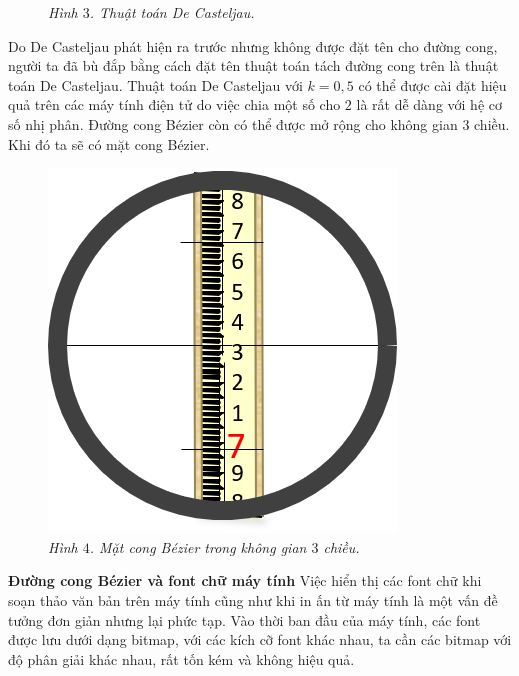 \begin{multicols}{2}
\begin{figure}[H]
		\caption{\small\textit{\color{toanhocdoisong}Hình $3$. Thuật toán De Casteljau.}}
		\vspace*{-5pt}
	\end{figure}
	Do De Casteljau phát hiện ra trước nhưng không được đặt tên cho đường cong, người ta đã bù đắp bằng cách đặt tên thuật toán tách đường cong trên là thuật toán De Casteljau. Thuật toán De Casteljau với $k=0,5$ có thể được cài đặt hiệu quả trên các máy tính điện tử do việc chia một số cho $2$ là rất dễ dàng với hệ cơ số nhị phân.
	\vskip 0.1cm
	Đường cong Bézier còn có thể được mở rộng cho không gian $3$ chiều. Khi đó ta sẽ có mặt cong Bézier.
	\begin{figure}[H]
		\vspace*{-5pt}
		\centering
		\captionsetup{labelformat= empty, justification=centering}
		\includegraphics[width= 1\linewidth]{5}
		\caption{\small\textit{\color{toanhocdoisong}Hình $4$. Mặt cong Bézier trong không gian $3$ chiều.}}
		\vspace*{-10pt}
	\end{figure}
	\textbf{\color{toanhocdoisong}Đường cong Bézier và font chữ máy tính}
	\vskip 0.1cm
	Việc hiển thị các font chữ khi soạn thảo văn bản trên máy tính cũng như khi in ấn từ máy tính là một vấn đề tưởng đơn giản nhưng lại phức tạp. Vào thời ban đầu của máy tính, các font được lưu dưới dạng bitmap, với các kích cỡ font khác nhau, ta cần các bitmap với độ phân giải khác nhau, rất tốn kém và không hiệu quả.

\end{multicols}
